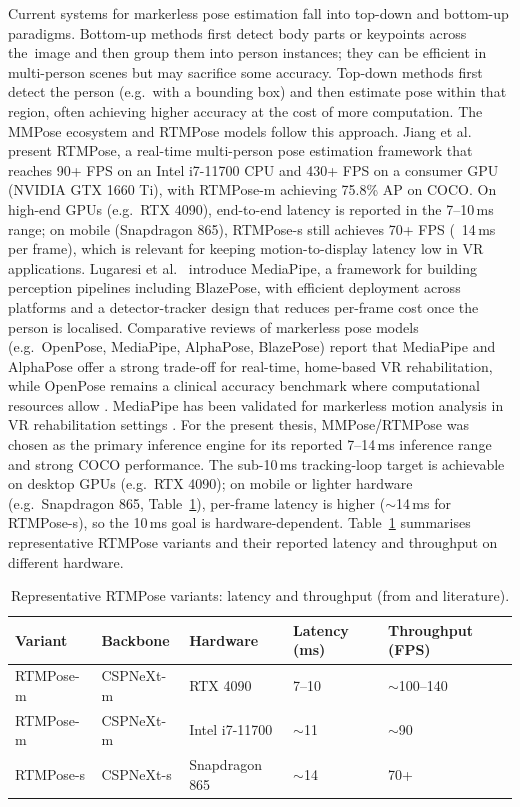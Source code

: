 Current systems for markerless pose estimation fall into top-down and bottom-up paradigms. Bottom-up methods first detect body parts or keypoints across the~image and then group them into person instances; they can be efficient in multi-person scenes but may sacrifice some accuracy. Top-down methods first detect the person (e.g.\ with a bounding box) and then estimate pose within that region, often achieving higher accuracy at the cost of more computation. The MMPose ecosystem and RTMPose models follow this approach. Jiang et al.\ \cite{Jiang.2023} present RTMPose, a real-time multi-person pose estimation framework that reaches 90+ FPS on an Intel i7-11700 CPU and 430+ FPS on a consumer GPU (NVIDIA GTX 1660 Ti), with RTMPose-m achieving 75.8\% AP on COCO. On high-end GPUs (e.g.\ RTX 4090), end-to-end latency is reported in the 7--10\,ms range; on mobile (Snapdragon 865), RTMPose-s still achieves 70+ FPS (~14\,ms per frame), which is relevant for keeping motion-to-display latency low in VR applications. Lugaresi et al.\ \cite{Lugaresi.2019} introduce MediaPipe, a framework for building perception pipelines including BlazePose, with efficient deployment across platforms and a detector-tracker design that reduces per-frame cost once the person is localised. Comparative reviews of markerless pose models (e.g.\ OpenPose, MediaPipe, AlphaPose, BlazePose) report that MediaPipe and AlphaPose offer a strong trade-off for real-time, home-based VR rehabilitation, while OpenPose remains a clinical accuracy benchmark where computational resources allow \cite{Lugaresi.2019}. MediaPipe has been validated for markerless motion analysis in VR rehabilitation settings \cite{francia2024mediapipe}. For the present thesis, MMPose/RTMPose was chosen as the primary inference engine for its reported 7--14\,ms inference range and strong COCO performance. The sub-10\,ms tracking-loop target is achievable on desktop GPUs (e.g.\ RTX 4090); on mobile or lighter hardware (e.g.\ Snapdragon 865, Table~\ref{tab:rtmpose-variants}), per-frame latency is higher ($\sim$14\,ms for RTMPose-s), so the 10\,ms goal is hardware-dependent. Table~\ref{tab:rtmpose-variants} summarises representative RTMPose variants and their reported latency and throughput on different hardware.

\begin{table}[htbp]
\centering
\caption{Representative RTMPose variants: latency and throughput (from \cite{Jiang.2023} and literature).}
\label{tab:rtmpose-variants}
\begin{tabular*}{\textwidth}{@{\extracolsep{\fill}}lllll@{}}
\toprule
Variant & Backbone & Hardware & Latency (ms) & Throughput (FPS) \\
\midrule
RTMPose-m & CSPNeXt-m & RTX 4090 & 7--10 & $\sim$100--140 \\
RTMPose-m & CSPNeXt-m & Intel i7-11700 & $\sim$11 & $\sim$90 \\
RTMPose-s & CSPNeXt-s & Snapdragon 865 & $\sim$14 & 70+ \\
\bottomrule
\end{tabular*}
\end{table}

